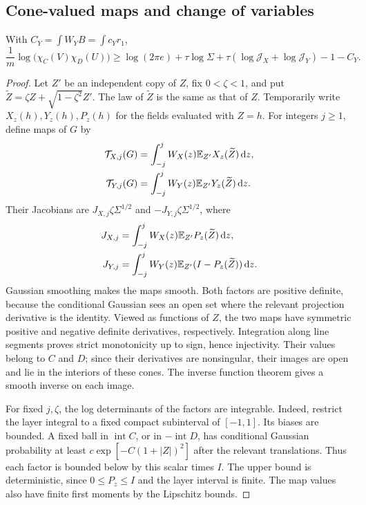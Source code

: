 \subsection{Cone-valued maps and change of variables}
\begin{lemma}\label{lem:cone-entropy-maps}
With $C_Y=\int W_YB=\int c_Yr_1$,
\[
\frac1m\log\bigl(\chi_C(V)\chi_D(U)\bigr)
\ge\log(2\pi e)+\tau\log\Sigma
+\tau(\log\mathcal{J}_X+\log\mathcal{J}_Y)-1-C_Y.
\]
\end{lemma}
\begin{proof}
Let $Z'$ be an independent copy of $Z$, fix $0<\zeta<1$, and put $\widetilde Z=\zeta Z+\sqrt{1-\zeta^2}Z'$. The law of $\widetilde Z$ is the same as that of $Z$. Temporarily write $X_z(h),Y_z(h),P_z(h)$ for the fields evaluated with $Z=h$. For integers $j\ge1$, define maps of $G$ by
\[
\begin{aligned}
\mathcal{T}_{X,j}(G)&=\int_{-j}^jW_X(z)\mathbb{E}_{Z'}X_z(\widetilde Z)\,\mathrm{d} z,\\
\mathcal{T}_{Y,j}(G)&=\int_{-j}^jW_Y(z)\mathbb{E}_{Z'}Y_z(\widetilde Z)\,\mathrm{d} z.
\end{aligned}
\]
Their Jacobians are $J_{X,j}\zeta\Sigma^{1/2}$ and $-J_{Y,j}\zeta\Sigma^{1/2}$, where
\[
\begin{aligned}
J_{X,j}&=\int_{-j}^jW_X(z)\mathbb{E}_{Z'}P_z(\widetilde Z)\,\mathrm{d} z,\\
J_{Y,j}&=\int_{-j}^jW_Y(z)\mathbb{E}_{Z'}(I-P_z(\widetilde Z))\,\mathrm{d} z.
\end{aligned}
\]
Gaussian smoothing makes the maps smooth. Both factors are positive definite, because the conditional Gaussian sees an open set where the relevant projection derivative is the identity. Viewed as functions of $Z$, the two maps have symmetric positive and negative definite derivatives, respectively. Integration along line segments proves strict monotonicity up to sign, hence injectivity. Their values belong to $C$ and $D$; since their derivatives are nonsingular, their images are open and lie in the interiors of these cones. The inverse function theorem gives a smooth inverse on each image.

For fixed $j,\zeta$, the log determinants of the factors are integrable. Indeed, restrict the layer integral to a fixed compact subinterval of $[-1,1]$. Its biases are bounded. A fixed ball in $\operatorname{int}C$, or in $-\operatorname{int}D$, has conditional Gaussian probability at least $c\exp[-C(1+|Z|)^2]$ after the relevant translations. Thus each factor is bounded below by this scalar times $I$. The upper bound is deterministic, since $0\le P_z\le I$ and the layer interval is finite. The map values also have finite first moments by the Lipschitz bounds.


\end{proof}
